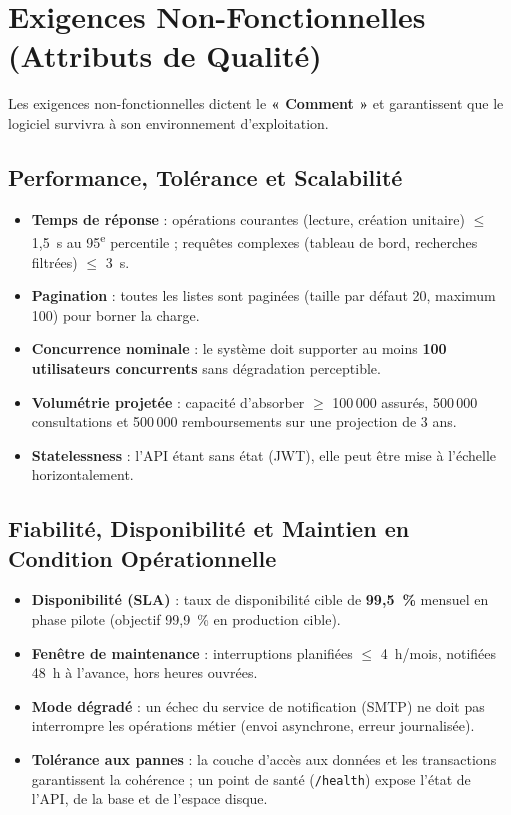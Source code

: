 \documentclass[11pt,a4paper]{article}
\begin{document}
\section{Exigences Non-Fonctionnelles (Attributs de Qualité)}

Les exigences non-fonctionnelles dictent le \textbf{« Comment »} et garantissent que le
logiciel survivra à son environnement d'exploitation.

\subsection{Performance, Tolérance et Scalabilité}
\begin{itemize}[leftmargin=1.4em]
  \item \textbf{Temps de réponse} : opérations courantes (lecture, création unitaire)
  $\leq$ 1,5~s au 95\textsuperscript{e} percentile ; requêtes complexes (tableau de
  bord, recherches filtrées) $\leq$ 3~s.
  \item \textbf{Pagination} : toutes les listes sont paginées (taille par défaut 20,
  maximum 100) pour borner la charge.
  \item \textbf{Concurrence nominale} : le système doit supporter au moins
  \textbf{100 utilisateurs concurrents} sans dégradation perceptible.
  \item \textbf{Volumétrie projetée} : capacité d'absorber $\geq$ 100\,000 assurés,
  500\,000 consultations et 500\,000 remboursements sur une projection de 3 ans.
  \item \textbf{Statelessness} : l'API étant sans état (JWT), elle peut être mise à
  l'échelle horizontalement.
\end{itemize}

\subsection{Fiabilité, Disponibilité et Maintien en Condition Opérationnelle}
\begin{itemize}[leftmargin=1.4em]
  \item \textbf{Disponibilité (SLA)} : taux de disponibilité cible de \textbf{99,5~\%}
  mensuel en phase pilote (objectif 99,9~\% en production cible).
  \item \textbf{Fenêtre de maintenance} : interruptions planifiées $\leq$ 4~h/mois,
  notifiées 48~h à l'avance, hors heures ouvrées.
  \item \textbf{Mode dégradé} : un échec du service de notification (SMTP) ne doit pas
  interrompre les opérations métier (envoi asynchrone, erreur journalisée).
  \item \textbf{Tolérance aux pannes} : la couche d'accès aux données et les transactions
  garantissent la cohérence ; un point de santé (\texttt{/health}) expose l'état de l'API,
  de la base et de l'espace disque.
\end{itemize}
\end{document}
